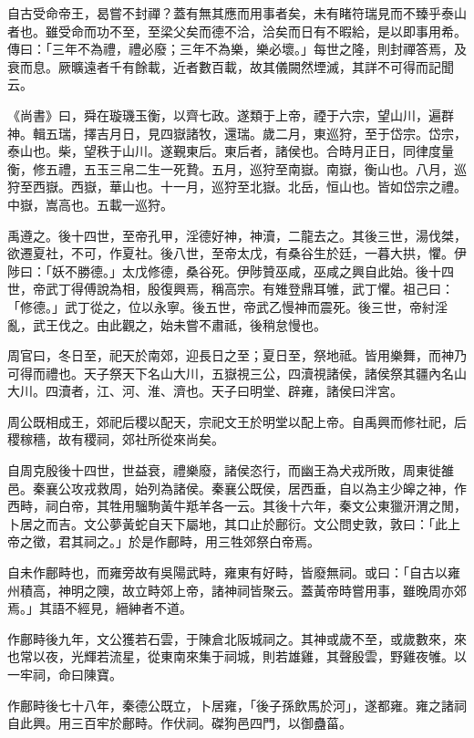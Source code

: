 
\begin{pinyinscope}
自古受命帝王，曷嘗不封禪？蓋有無其應而用事者矣，未有睹符瑞見而不臻乎泰山者也。雖受命而功不至，至梁父矣而德不洽，洽矣而日有不暇給，是以即事用希。傳曰：「三年不為禮，禮必廢；三年不為樂，樂必壞。」每世之隆，則封禪答焉，及衰而息。厥曠遠者千有餘載，近者數百載，故其儀闕然堙滅，其詳不可得而記聞云。

《尚書》曰，舜在璇璣玉衡，以齊七政。遂類于上帝，禋于六宗，望山川，遍群神。輯五瑞，擇吉月日，見四嶽諸牧，還瑞。歲二月，東巡狩，至于岱宗。岱宗，泰山也。柴，望秩于山川。遂覲東后。東后者，諸侯也。合時月正日，同律度量衡，修五禮，五玉三帛二生一死贄。五月，巡狩至南嶽。南嶽，衡山也。八月，巡狩至西嶽。西嶽，華山也。十一月，巡狩至北嶽。北岳，恒山也。皆如岱宗之禮。中嶽，嵩高也。五載一巡狩。

禹遵之。後十四世，至帝孔甲，淫德好神，神瀆，二龍去之。其後三世，湯伐桀，欲遷夏社，不可，作夏社。後八世，至帝太戊，有桑谷生於廷，一暮大拱，懼。伊陟曰：「妖不勝德。」太戊修德，桑谷死。伊陟贊巫咸，巫咸之興自此始。後十四世，帝武丁得傅說為相，殷復興焉，稱高宗。有雉登鼎耳雊，武丁懼。祖己曰：「修德。」武丁從之，位以永寧。後五世，帝武乙慢神而震死。後三世，帝紂淫亂，武王伐之。由此觀之，始未嘗不肅祗，後稍怠慢也。

周官曰，冬日至，祀天於南郊，迎長日之至；夏日至，祭地祗。皆用樂舞，而神乃可得而禮也。天子祭天下名山大川，五嶽視三公，四瀆視諸侯，諸侯祭其疆內名山大川。四瀆者，江、河、淮、濟也。天子曰明堂、辟雍，諸侯曰泮宮。

周公既相成王，郊祀后稷以配天，宗祀文王於明堂以配上帝。自禹興而修社祀，后稷稼穡，故有稷祠，郊社所從來尚矣。

自周克殷後十四世，世益衰，禮樂廢，諸侯恣行，而幽王為犬戎所敗，周東徙雒邑。秦襄公攻戎救周，始列為諸侯。秦襄公既侯，居西垂，自以為主少皞之神，作西畤，祠白帝，其牲用騮駒黃牛羝羊各一云。其後十六年，秦文公東獵汧渭之閒，卜居之而吉。文公夢黃蛇自天下屬地，其口止於鄜衍。文公問史敦，敦曰：「此上帝之徵，君其祠之。」於是作鄜畤，用三牲郊祭白帝焉。

自未作鄜畤也，而雍旁故有吳陽武畤，雍東有好畤，皆廢無祠。或曰：「自古以雍州積高，神明之隩，故立畤郊上帝，諸神祠皆聚云。蓋黃帝時嘗用事，雖晚周亦郊焉。」其語不經見，縉紳者不道。

作鄜畤後九年，文公獲若石雲，于陳倉北阪城祠之。其神或歲不至，或歲數來，來也常以夜，光輝若流星，從東南來集于祠城，則若雄雞，其聲殷雲，野雞夜雊。以一牢祠，命曰陳寶。

作鄜畤後七十八年，秦德公既立，卜居雍，「後子孫飲馬於河」，遂都雍。雍之諸祠自此興。用三百牢於鄜畤。作伏祠。磔狗邑四門，以御蠱菑。


\end{pinyinscope}
